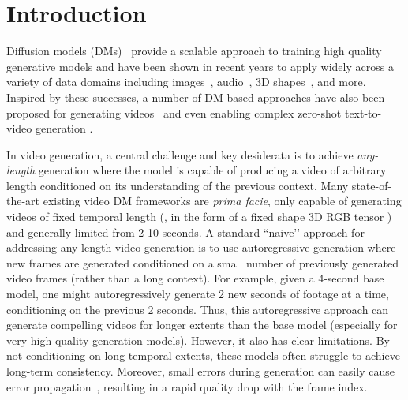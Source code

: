 \vspace{-0.1in}
\section{Introduction}
\label{sec:intro}
Diffusion models (DMs)~\citep{ho2021denoising,song2021scorebased} provide a scalable approach to training high quality generative models and have been shown in recent years to apply widely across a variety of data domains including images~\citep{dhariwal2021diffusion,karras2022edm}, audio~\citep{kong2020diffwave,lakhotia2021generative}, 3D shapes~\citep{lee2024dreamflow, luo2021diffusion, zeng2022lion}, and more. Inspired by these successes, a number of DM-based approaches have also been proposed for generating videos~\citep{blattmann2023align,gupta2023photorealistic,ho2022video,bar2024lumiere} and even enabling complex zero-shot text-to-video generation \citep{gupta2023photorealistic,videoworldsimulators2024}.



In video generation, a central challenge and key desiderata is to achieve \emph{any-length} generation where the model is capable of producing a video of arbitrary length conditioned on its understanding of the previous context. Many state-of-the-art existing video DM frameworks are \emph{prima facie}, only capable of generating videos of fixed temporal length (\eg, in the form of a fixed shape 3D RGB tensor \citep{ho2022video}) and generally limited from 2-10 seconds. A standard ``naive’’ approach for addressing any-length video generation is to use autoregressive generation where new frames are generated conditioned on a small number of previously generated video frames (rather than a long context). For example, given a 4-second base model, one might autoregressively generate 2 new seconds of footage at a time, conditioning on the previous 2 seconds. Thus, this autoregressive approach can generate compelling videos for longer extents than the base model (especially for very high-quality generation models). However, it also has clear limitations. By not conditioning on long temporal extents, these models often struggle to achieve long-term consistency.  Moreover, small errors during generation can easily cause error propagation~\citep{ruhe2024rolling}, resulting in a rapid quality drop with the frame index.

